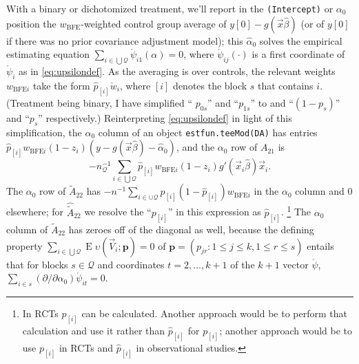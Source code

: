 \documentclass{article}
\newcommand{\EE}{\operatorname{E}}
\newcommand{\owt}[1][{[z_{i}]}]{\ensuremath{\check{w}_{i#1}}}
\newcommand{\absorbInterceptsEF}{\upsilon}
\begin{document}
With a binary or dichotomized treatment, we'll report in the
\texttt{(Intercept)} or $\alpha_{0}$ position the $w_{\text{BFE}}$-weighted
control group average of $y[0] - g(\vec{x}\hat\beta)$ (or of $y[0]$ if
there was no prior covariance adjustment model); this
$\hat{\alpha}_{0}$ solves the empirical estimating equation $\sum_{i
  \in \bigcup\mathcal{Q}}\acute{\psi}_{i1}(\alpha)=0$, where
$\acute{\psi}_{ij}(\cdot)$ is a first coordinate of
$\acute{\psi}_{i}$ as in \eqref{eq:upsilondef}. As the
averaging is over controls, the relevant weights $w_{\text{BFE}i}$ take
the form $\hat{p}_{[i]} \owt[]$, where $[i]$ denotes the block $s$
that contains $i$.  (Treatment being
binary, I have simplified `` $p_{0s}$'' and ``$p_{1s}$'' to 
and ``$(1-p_{s})$'' and ``$p_{s}$'' respectively.)
Reinterpreting \eqref{eq:upsilondef} in light of
this simplification, the
$\alpha_{0}$ column of an object \texttt{estfun.teeMod(DA)} has entries
$\hat{p}_{[i]}w_{\text{BFE}i}(1-z_{i})(y - g(\vec{x}\hat{\beta}) -
\hat{\alpha}_{0})$, and the $\alpha_{0}$ row of $A_{21}$ is 
\begin{equation*}
  -n_{\mathcal{Q}}^{-1}\sum_{i\in \bigcup\mathcal{Q} }
  \hat{p}_{[i]}w_{\text{BFE}i} (1-z_{i})g'(\vec{x}_{i}\hat{\beta}) \vec{x}_{i}.
\end{equation*}
The
$\alpha_{0}$ row of $\tilde{A}_{22}$ has $-n^{-1}\sum_{i \in \cup \mathcal{Q}}
p_{[i]}(1-\hat{p}_{[i]})w_{\text{BFE}i}$ in the
$\alpha_{0}$ column and 0 elsewhere; for $\hat{\tilde{A}}_{22}$ we resolve the
``$p_{[i]}$'' in this expression as $\hat{p}_{[i]}$.%
\footnote{In RCTs $p_{[i]}$ can be calculated. Another approach would
  be to perform that calculation and use it rather than
  $\hat{p}_{[i]}$ for $p_{[i]}$; another approach would be to use
  $p_{[i]}$ in RCTs and $\hat{p}_{[i]}$ in observational studies.}
The $\alpha_{0}$
column of $\tilde{A}_{22}$ has zeroes off of the diagonal as well, because the
defining property $\sum_{i \in \bigcup \mathcal{Q}}\EE
\absorbInterceptsEF(\vec{V}_{i}; \mathbf{p}) =0$ of $\mathbf{p} = (p_{jr}: 1\leq j\leq k, 1\leq r\leq s)$
entails that for blocks $s \in \mathcal{Q}$ and coordinates $t=2,
\ldots, k+1$ of the $k+1$ vector $\acute{\psi}$,  $\sum_{i \in
  s}(\partial/\partial \alpha_{0})\acute{\psi}_{i t} = 0$. 
\end{document}
